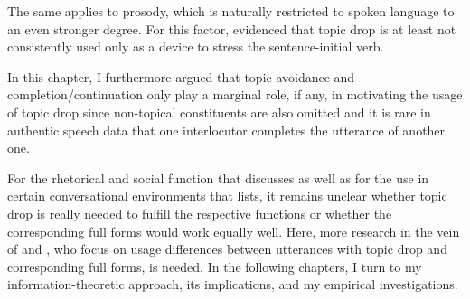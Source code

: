 The same applies to prosody,  which is naturally restricted to spoken language to an even stronger degree.
For this factor, \citet{helmer2016} evidenced that topic drop is at least not consistently used only as a device to stress the sentence-initial verb.

In this chapter, I furthermore argued that topic avoidance and completion/continuation only play a marginal role, if any, in motivating the usage of topic drop since non-topical constituents are also omitted and it is rare in authentic speech data that one interlocutor completes the utterance of another one.

For the rhetorical and social function that \citet{helmer2016} discusses as well as for the use in certain conversational environments that \citet{auer1993} lists, it remains unclear whether topic drop is really needed to fulfill the respective functions or whether the corresponding full forms would work equally well.
Here, more research in the vein of \citet{eckert1998.diss} and \citet{helmer2016}, who focus on usage differences between utterances with topic drop and corresponding full forms, is needed.
In the following chapters, I turn to my information-theoretic approach, its implications, and my empirical investigations.

